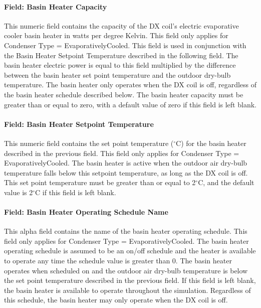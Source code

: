 \paragraph{Field: Basin Heater Capacity}\label{field-basin-heater-capacity-000}

This numeric field contains the capacity of the DX coil's electric evaporative cooler basin heater in watts per degree Kelvin. This field only applies for Condenser Type = EvaporativelyCooled. This field is used in conjunction with the Basin Heater Setpoint Temperature described in the following field. The basin heater electric power is equal to this field multiplied by the difference between the basin heater set point temperature and the outdoor dry-bulb temperature. The basin heater only operates when the DX coil is off, regardless of the basin heater schedule described below. The basin heater capacity must be greater than or equal to zero, with a default value of zero if this field is left blank.

\paragraph{Field: Basin Heater Setpoint Temperature}\label{field-basin-heater-setpoint-temperature-000}

This numeric field contains the set point temperature ($^\circ$C) for the basin heater described in the previous field. This field only applies for Condenser Type = EvaporativelyCooled. The basin heater is active when the outdoor air dry-bulb temperature falls below this setpoint temperature, as long as the DX coil is off. This set point temperature must be greater than or equal to 2$^\circ$C, and the default value is 2$^\circ$C if this field is left blank.

\paragraph{Field: Basin Heater Operating Schedule Name}\label{field-basin-heater-operating-schedule-name-000}

This alpha field contains the name of the basin heater operating schedule. This field only applies for Condenser Type = EvaporativelyCooled. The basin heater operating schedule is assumed to be an on/off schedule and the heater is available to operate any time the schedule value is greater than 0. The basin heater operates when scheduled on and the outdoor air dry-bulb temperature is below the set point temperature described in the previous field. If this field is left blank, the basin heater is available to operate throughout the simulation. Regardless of this schedule, the basin heater may only operate when the DX coil is off.


